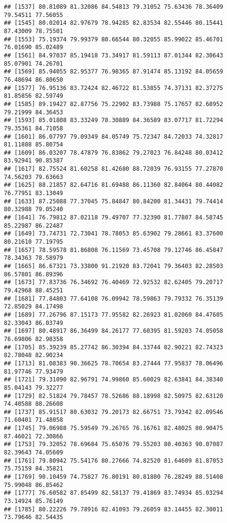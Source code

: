 \documentclass[
]{article}
\begin{document}
\begin{verbatim}
## [1537] 80.81089 81.32086 84.54813 79.31052 75.63436 78.36409 79.54511 77.56055
## [1545] 80.02014 82.97679 78.94285 82.83534 82.55446 80.15441 87.43009 78.75501
## [1553] 75.19374 79.99379 80.66544 80.32055 85.99022 85.46701 76.01690 85.02489
## [1561] 84.97037 85.19418 73.34917 81.59113 87.01344 82.30643 85.07901 74.26701
## [1569] 85.94055 82.95377 76.98365 87.91474 85.13192 84.05659 76.48694 86.80650
## [1577] 76.95136 83.72424 82.46722 81.53855 74.37131 82.37275 81.85856 82.59749
## [1585] 89.19427 82.87756 75.22902 83.73988 75.17657 82.68952 79.21999 84.36453
## [1593] 85.01808 83.33249 78.30889 84.36589 83.07717 81.72294 79.35361 84.71058
## [1601] 86.07797 79.09349 84.05749 75.72347 84.72033 74.32817 81.11888 85.80754
## [1609] 86.03207 78.47879 76.83862 79.27023 76.84248 80.03412 83.92941 90.85387
## [1617] 82.75524 81.60258 81.42680 88.72039 76.93155 77.27870 74.56203 79.63663
## [1625] 88.21857 82.64716 81.69488 86.11360 82.84064 80.44082 76.77951 83.13049
## [1633] 87.25088 77.37045 75.84847 80.84200 81.34431 79.74414 80.32988 79.05240
## [1641] 76.79812 87.02118 79.49707 77.32390 81.77807 84.58745 85.22987 86.22487
## [1649] 73.74731 72.73041 78.78053 85.63902 79.28661 83.37600 80.21610 77.19795
## [1657] 78.59578 81.86808 76.11569 73.45708 79.12746 86.45847 78.34363 78.58979
## [1665] 86.67321 73.33800 91.21920 83.72041 79.36403 82.28503 86.57801 86.89396
## [1673] 77.83736 76.34692 76.40469 72.92532 82.62405 79.20717 79.42968 88.45251
## [1681] 77.84803 77.64108 76.09942 78.59863 79.79332 76.35139 72.85029 84.17498
## [1689] 77.26796 87.15173 77.95582 82.26923 81.02060 84.47605 82.33043 86.03749
## [1697] 80.48917 86.36499 84.26177 77.60395 81.59203 74.05058 76.69806 82.98358
## [1705] 85.39239 85.27742 86.30394 84.33744 82.90221 82.74323 82.78048 82.90234
## [1713] 81.08383 90.36625 78.70654 83.27444 77.95837 78.06496 81.97746 77.93479
## [1721] 79.31090 82.96791 74.99860 85.60029 82.63841 84.38340 85.04143 79.32277
## [1729] 82.51824 79.78457 78.52686 88.18998 82.50975 82.63120 74.40588 88.26608
## [1737] 85.91517 80.63032 79.20173 82.66751 73.79342 82.09546 71.60401 71.48058
## [1745] 79.06988 75.59549 79.26765 76.16761 82.48025 80.90475 87.46021 72.30866
## [1753] 79.32052 78.69684 75.65076 79.55203 80.40363 90.07087 82.39643 74.05609
## [1761] 79.80942 75.54176 80.27666 74.82520 81.64609 81.87053 75.75159 84.35821
## [1769] 90.10459 74.75827 76.80191 80.81880 76.28249 88.51408 75.99048 86.85462
## [1777] 76.60582 87.85499 82.58137 79.41869 83.74934 85.03294 73.14924 85.76149
## [1785] 80.22226 79.78916 82.41093 79.26059 83.14455 82.30011 73.79646 82.54435

\end{verbatim}
\end{document}
